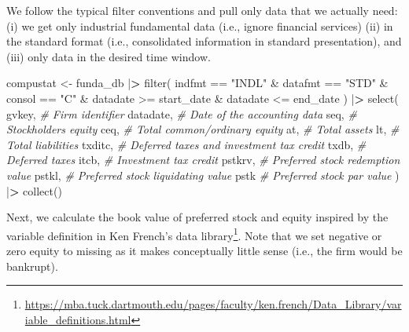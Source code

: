 \documentclass[
]{book}
\newenvironment{Shaded}{\begin{snugshade}}{\end{snugshade}}
\newcommand{\CommentTok}[1]{\textcolor[rgb]{0.37,0.37,0.37}{\textit{#1}}}
\newcommand{\ErrorTok}[1]{\textcolor[rgb]{0.14,0.14,0.14}{\textbf{#1}}}
\newcommand{\FunctionTok}[1]{\textcolor[rgb]{0,0,0}{#1}}
\newcommand{\NormalTok}[1]{#1}
\newcommand{\OtherTok}[1]{\textcolor[rgb]{0.37,0.37,0.37}{#1}}
\newcommand{\SpecialCharTok}[1]{\textcolor[rgb]{0,0,0}{#1}}
\newcommand{\StringTok}[1]{\textcolor[rgb]{0.5,0.5,0.5}{#1}}
\renewcommand{\href}[2]{#2\footnote{\url{#1}}}
\begin{document}
We follow the typical filter conventions and pull only data that we actually need: (i) we get only industrial fundamental data (i.e., ignore financial services) (ii) in the standard format (i.e., consolidated information in standard presentation), and (iii) only data in the desired time window.

\begin{Shaded}
\begin{Highlighting}[]
\NormalTok{compustat }\OtherTok{\textless{}{-}}\NormalTok{ funda\_db }\SpecialCharTok{|}\ErrorTok{\textgreater{}}
  \FunctionTok{filter}\NormalTok{(}
\NormalTok{    indfmt }\SpecialCharTok{==} \StringTok{"INDL"} \SpecialCharTok{\&}
\NormalTok{      datafmt }\SpecialCharTok{==} \StringTok{"STD"} \SpecialCharTok{\&}
\NormalTok{      consol }\SpecialCharTok{==} \StringTok{"C"} \SpecialCharTok{\&}
\NormalTok{      datadate }\SpecialCharTok{\textgreater{}=}\NormalTok{ start\_date }\SpecialCharTok{\&}\NormalTok{ datadate }\SpecialCharTok{\textless{}=}\NormalTok{ end\_date}
\NormalTok{  ) }\SpecialCharTok{|}\ErrorTok{\textgreater{}}
  \FunctionTok{select}\NormalTok{(}
\NormalTok{    gvkey, }\CommentTok{\# Firm identifier}
\NormalTok{    datadate, }\CommentTok{\# Date of the accounting data}
\NormalTok{    seq, }\CommentTok{\# Stockholders\textquotesingle{} equity}
\NormalTok{    ceq, }\CommentTok{\# Total common/ordinary equity}
\NormalTok{    at, }\CommentTok{\# Total assets}
\NormalTok{    lt, }\CommentTok{\# Total liabilities}
\NormalTok{    txditc, }\CommentTok{\# Deferred taxes and investment tax credit}
\NormalTok{    txdb, }\CommentTok{\# Deferred taxes}
\NormalTok{    itcb, }\CommentTok{\# Investment tax credit}
\NormalTok{    pstkrv, }\CommentTok{\# Preferred stock redemption value}
\NormalTok{    pstkl, }\CommentTok{\# Preferred stock liquidating value}
\NormalTok{    pstk }\CommentTok{\# Preferred stock par value}
\NormalTok{  ) }\SpecialCharTok{|}\ErrorTok{\textgreater{}}
  \FunctionTok{collect}\NormalTok{()}
\end{Highlighting}
\end{Shaded}

Next, we calculate the book value of preferred stock and equity inspired by the \href{https://mba.tuck.dartmouth.edu/pages/faculty/ken.french/Data_Library/variable_definitions.html}{variable definition in Ken French's data library}. Note that we set negative or zero equity to missing as it makes conceptually little sense (i.e., the firm would be bankrupt).
\end{document}
